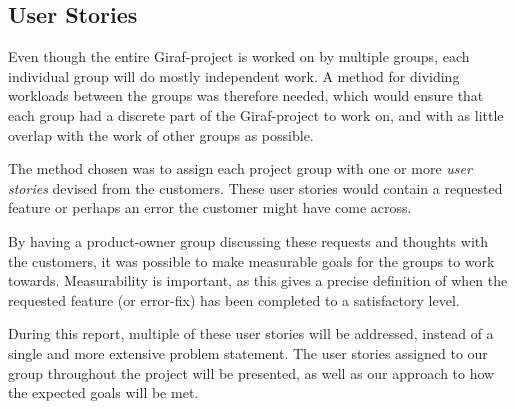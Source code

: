 \subsection{User Stories} \label{ssec:UserStories}
Even though the entire Giraf-project is worked on by multiple groups, each individual group will do mostly independent work.
A method for dividing workloads between the groups was therefore needed, which would ensure that each group had a discrete part of the Giraf-project to work on, and with as little overlap with the work of other groups as possible.

The method chosen was to assign each project group with one or more \textit{user stories} devised from the customers.
These user stories would contain a requested feature or perhaps an error the customer might have come across.

By having a product-owner group discussing these requests and thoughts with the customers, it was possible to make measurable goals for the groups to work towards.
Measurability is important, as this gives a precise definition of when the requested feature (or error-fix) has been completed to a satisfactory level.

During this report, multiple of these user stories will be addressed, instead of a single and more extensive problem statement.
The user stories assigned to our group throughout the project will be presented, as well as our approach to how the expected goals will be met.
